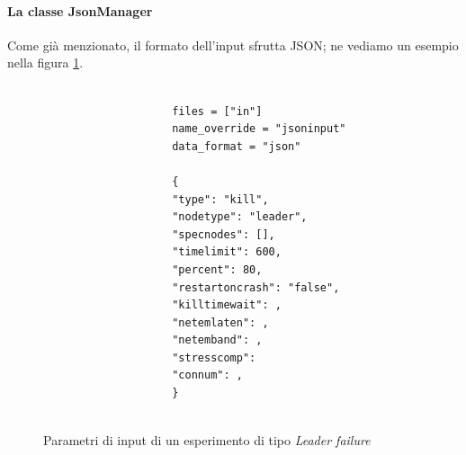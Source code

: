         \paragraph{La classe JsonManager}\mbox{}\newline
        Come già menzionato, il formato dell’input sfrutta JSON; ne vediamo un esempio nella figura \ref{fig:json}.
        \begin{figure}
            \begin{center}
                \begin{lstlisting}

                    files = ["in"] 
                    name_override = "jsoninput" 
                    data_format = "json" 
                    
                    {
                    "type": "kill", 
                    "nodetype": "leader", 
                    "specnodes": [], 
                    "timelimit": 600, 
                    "percent": 80, 
                    "restartoncrash": "false", 
                    "killtimewait": , 
                    "netemlaten": , 
                    "netemband": , 
                    "stresscomp": 
                    "connum": , 
                    }
                    
                \end{lstlisting}
                \caption {Parametri di input di un esperimento di tipo \textit{Leader failure}}
                \label{fig:json}
            \end{center}
        \end{figure}
        
